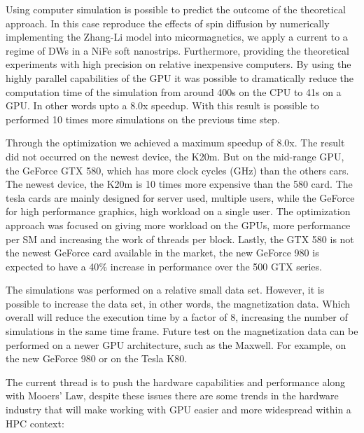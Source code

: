 Using computer simulation is possible to predict the outcome of the theoretical approach. In this case reproduce the effects of spin diffusion by numerically implementing the Zhang-Li model into micormagnetics, we apply a current to a regime of DWs in a NiFe soft nanostrips. Furthermore, providing the theoretical experiments with high precision on relative inexpensive computers. By using the highly parallel capabilities of the GPU it was possible to dramatically reduce the computation time of the simulation from around 400s on the CPU to 41s on a GPU. In other words upto a 8.0x speedup. With this result is possible to performed 10 times more simulations on the previous time step. 

Through the optimization we achieved a maximum speedup of 8.0x. The result did not occurred on the newest device, the K20m. But on the mid-range GPU, the GeForce GTX 580, which has more clock cycles (GHz) than the others cars. The newest device, the K20m is 10 times more expensive than the 580 card. The tesla cards are mainly designed for server used, multiple users, while the GeForce for high performance graphics, high workload on a single user. The  optimization approach was focused on giving more workload on the GPUs, more performance per SM and increasing the work of threads per block. Lastly, the GTX 580 is not the newest GeForce card available in the market, the new GeForce 980 is expected to have a 40$\%$ increase in performance over the 500 GTX series. 

The simulations was performed on a relative small data set. However, it is possible to increase the data set, in other words, the magnetization data. Which overall will reduce the execution time by a factor of 8, increasing the number of simulations in the same time frame. Future test on the magnetization data can be performed on a newer GPU architecture, such as the Maxwell. For example, on the new GeForce 980 or on the Tesla K80.

The current thread is to push the hardware capabilities and performance along with Mooers' Law, despite these issues there are some trends in the hardware industry that will make working with GPU easier and more widespread within a HPC context:

